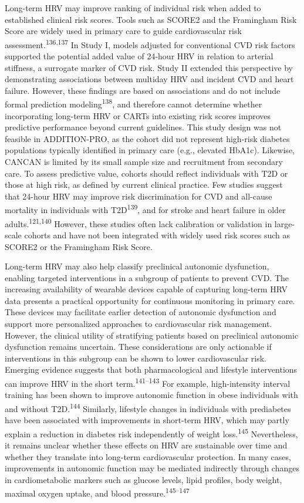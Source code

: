 \documentclass[
  a4paper,
  headsepline=true,
  open=any]{scrbook}
\begin{document}
Long-term HRV may improve ranking of individual risk when added to
established clinical risk scores. Tools such as SCORE2 and the
Framingham Risk Score are widely used in primary care to guide
cardiovascular risk assessment.\textsuperscript{136,137} In Study I,
models adjusted for conventional CVD risk factors supported the
potential added value of 24-hour HRV in relation to arterial stiffness,
a surrogate marker of CVD risk. Study II extended this perspective by
demonstrating associations between multiday HRV and incident CVD and
heart failure. However, these findings are based on associations and do
not include formal prediction modeling\textsuperscript{138}, and
therefore cannot determine whether incorporating long-term HRV or CARTs
into existing risk scores improves predictive performance beyond current
guidelines. This study design was not feasible in ADDITION-PRO, as the
cohort did not represent high-risk diabetes populations typically
identified in primary care (e.g., elevated HbA1c). Likewise, CANCAN is
limited by its small sample size and recruitment from secondary care. To
assess predictive value, cohorts should reflect individuals with T2D or
those at high risk, as defined by current clinical practice. Few studies
suggest that 24-hour HRV may improve risk discrimination for CVD and
all-cause mortality in individuals with T2D\textsuperscript{139}, and
for stroke and heart failure in older adults.\textsuperscript{121,140}
However, these studies often lack calibration or validation in
large-scale cohorts and have not been integrated with widely used risk
scores such as SCORE2 or the Framingham Risk Score.

Long-term HRV may also help classify preclinical autonomic dysfunction,
enabling targeted interventions in a subgroup of patients to prevent
CVD. The increasing availability of wearable devices capable of
capturing long-term HRV data presents a practical opportunity for
continuous monitoring in primary care. These devices may facilitate
earlier detection of autonomic dysfunction and support more personalized
approaches to cardiovascular risk management. However, the clinical
utility of stratifying patients based on preclinical autonomic
dysfunction remains uncertain. These considerations are only actionable
if interventions in this subgroup can be shown to lower cardiovascular
risk. Emerging evidence suggests that both pharmacological and lifestyle
interventions can improve HRV in the short
term.\textsuperscript{141--143} For example, high-intensity interval
training has been shown to improve autonomic function in obese
individuals with and without T2D.\textsuperscript{144} Similarly,
lifestyle changes in individuals with prediabetes have been associated
with improvements in short-term HRV, which may partly explain a
reduction in diabetes risk independently of weight
loss.\textsuperscript{145} Nevertheless, it remains unclear whether
these effects on HRV are sustainable over time and whether they
translate into long-term cardiovascular protection. In many cases,
improvements in autonomic function may be mediated indirectly through
changes in cardiometabolic markers such as glucose levels, lipid
profiles, body weight, maximal oxygen uptake, and blood
pressure.\textsuperscript{145--147}
\end{document}
